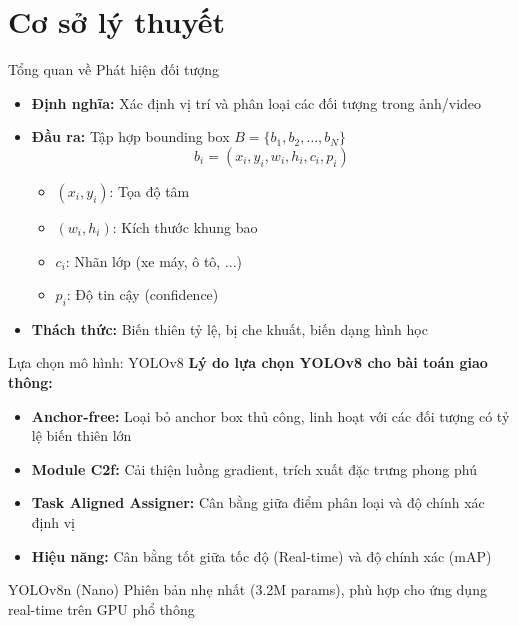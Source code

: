 \section{Cơ sở lý thuyết}

\begin{frame}{Tổng quan về Phát hiện đối tượng}
    \begin{itemize}
        \item \textbf{Định nghĩa:} Xác định vị trí và phân loại các đối tượng trong ảnh/video
        \item \textbf{Đầu ra:} Tập hợp bounding box $B = \{b_1, b_2, \dots, b_N\}$
        $$ b_i = (x_i, y_i, w_i, h_i, c_i, p_i) $$
        \begin{itemize}
            \item $(x_i, y_i)$: Tọa độ tâm
            \item $(w_i, h_i)$: Kích thước khung bao
            \item $c_i$: Nhãn lớp (xe máy, ô tô, ...)
            \item $p_i$: Độ tin cậy (confidence)
        \end{itemize}
        \item \textbf{Thách thức:} Biến thiên tỷ lệ, bị che khuất, biến dạng hình học
    \end{itemize}
\end{frame}

\begin{frame}{Lựa chọn mô hình: YOLOv8}
    \textbf{Lý do lựa chọn YOLOv8 cho bài toán giao thông:}
    \begin{itemize}
        \item \textbf{Anchor-free:} Loại bỏ anchor box thủ công, linh hoạt với các đối tượng có tỷ lệ biến thiên lớn
        \item \textbf{Module C2f:} Cải thiện luồng gradient, trích xuất đặc trưng phong phú
        \item \textbf{Task Aligned Assigner:} Cân bằng giữa điểm phân loại và độ chính xác định vị
        \item \textbf{Hiệu năng:} Cân bằng tốt giữa tốc độ (Real-time) và độ chính xác (mAP)
    \end{itemize}

    \vspace{0.5em}
    \begin{alertblock}{YOLOv8n (Nano)}
    Phiên bản nhẹ nhất (3.2M params), phù hợp cho ứng dụng real-time trên GPU phổ thông
    \end{alertblock}
\end{frame}

